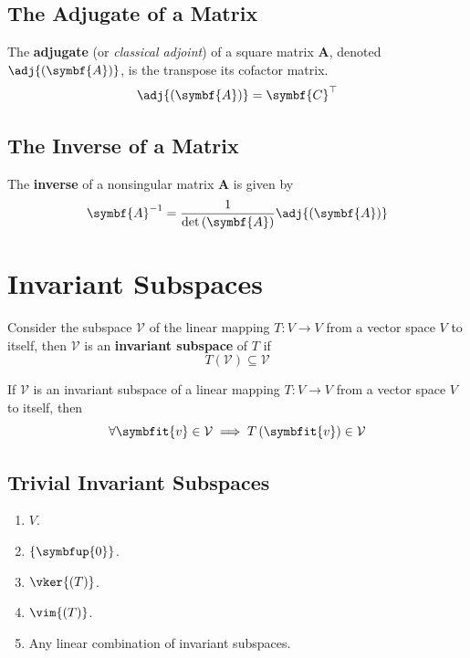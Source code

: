 \documentclass{article}
\begin{document}
\subsection{The Adjugate of a Matrix}
\begin{definition}
    The \textbf{adjugate} (or \textit{classical adjoint}) of a square
    matrix \(\symbf{A}\), denoted
    \(\adj{\left( \symbf{A} \right)}\), is the transpose its cofactor
    matrix.
    \begin{equation*}
        \adj{\left( \symbf{A} \right)} = \symbf{C}^\top
    \end{equation*}
\end{definition}
\subsection{The Inverse of a Matrix}
\begin{theorem}
    The \textbf{inverse} of a nonsingular matrix \(\symbf{A}\) is
    given by
    \begin{equation*}
        \symbf{A}^{-1}=\frac{1}{\det{\left( \symbf{A} \right)}} \adj{\left( \symbf{A} \right)}
    \end{equation*}
\end{theorem}
\newpage
\section{Invariant Subspaces}
\begin{definition}
    Consider the subspace \(\mathcal{V}\) of the linear mapping
    \(T:V\rightarrow V\) from a vector space \(V\) to itself, then
    \(\mathcal{V}\) is an \textbf{invariant subspace} of \(T\) if
    \begin{equation*}
        T\left(\mathcal{V}\right)\subseteq \mathcal{V}
    \end{equation*}
\end{definition}
\begin{theorem}
    If \(\mathcal{V}\) is an invariant subspace of a linear mapping
    \(T: V \rightarrow V\) from a vector space \(V\) to itself, then
    \begin{equation*}
        \forall \symbfit{v}\in \mathcal{V}\implies T\left(\symbfit{v}\right)\in \mathcal{V}
    \end{equation*}
\end{theorem}
\subsection{Trivial Invariant Subspaces}
\begin{enumerate}
    \item \(V\).
    \item \(\left\{ \symbfup{0} \right\}\).
    \item \(\vker{\left( T \right)}\).
    \item \(\vim{\left( T \right)}\).
    \item Any linear combination of invariant subspaces.
\end{enumerate}
\end{document}
